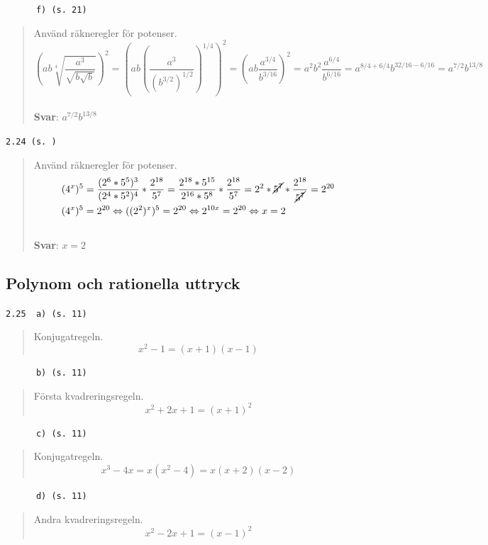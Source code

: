 \documentclass[a4paper]{article}
\newcommand{\tskcol}[1]{\textcolor{tskcol}{#1}}
\begin{document}
	\texttt{\tskcol{~~~~~~f) (s. 21)}}
	\begin{quotation}
		\noindent
		Använd räkneregler för potenser.
		\[\left(ab\sqrt[4]{\dfrac{a^3}{\sqrt{b\sqrt{b}}}}\right)^2=
		\left(ab\left(\dfrac{a^3}{(b^{3/2})^{1/2}}\right)^{1/4}\right)^2=
		\left(ab\dfrac{a^{3/4}}{b^{3/16}}\right)^2=
		a^2b^2\dfrac{a^{6/4}}{b^{6/16}}=
		a^{8/4+6/4}b^{32/16-6/16}=
		a^{7/2}b^{13/8}\]
		\\
		\textbf{Svar}: $a^{7/2}b^{13/8}$
	\end{quotation}
	
	\texttt{\tskcol{2.24 (s. )}}
	\begin{quotation}
		\noindent
		Använd räkneregler för potenser.
		\begin{align*}
			& (4^x)^5=\dfrac{(2^6*5^5)^3}{(2^4*5^2)^4}*\dfrac{2^{18}}{5^7}= \dfrac{2^{18}*5^{15}}{2^{16}*5^8}*\dfrac{2^{18}}{5^7}=
			2^2*\cancel{5^7}*\dfrac{2^{18}}{\cancel{5^7}}=
			2^{20} \\
			& (4^x)^5=2^{20} \Leftrightarrow 
			((2^2)^x)^5=2^{20} \Leftrightarrow 
			2^{10x}=2^{20} \Leftrightarrow x=2
		\end{align*}
		\\
		\textbf{Svar}: $x=2$
	\end{quotation}
	
	\subsection*{Polynom och rationella uttryck}
	
	\texttt{\tskcol{2.25~~a) (s. 11)}}
	\begin{quotation}
		\noindent
		Konjugatregeln.
		\[x^2-1=(x+1)(x-1)\]
	\end{quotation}
	
	\texttt{\tskcol{~~~~~~b) (s. 11)}}
	\begin{quotation}
		\noindent
		Första kvadreringsregeln.
		\[x^2+2x+1=(x+1)^2\]
	\end{quotation}
	
	\pagebreak
	\texttt{\tskcol{~~~~~~c) (s. 11)}}
	\begin{quotation}
		\noindent
		Konjugatregeln.
		\[x^3-4x=x(x^2-4)=x(x+2)(x-2)\]
	\end{quotation}
	
	\texttt{\tskcol{~~~~~~d) (s. 11)}}
	\begin{quotation}
		\noindent
		Andra kvadreringsregeln.
		\[x^2-2x+1=(x-1)^2\]
	\end{quotation}
	
\end{document}
